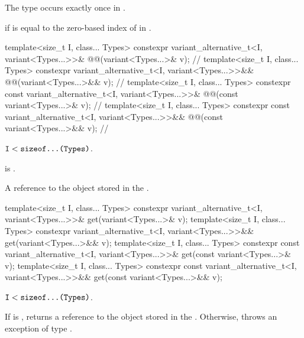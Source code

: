 \begin{itemdescr}
\pnum
\mandates
The type  occurs exactly once in .

\pnum
\returns
{} if  is equal to the zero-based index of  in .
\end{itemdescr}

\begin{itemdecl}
template<size_t I, class... Types>
  constexpr variant_alternative_t<I, variant<Types...>>&
    @@(variant<Types...>& v);                                  // \expos
template<size_t I, class... Types>
  constexpr variant_alternative_t<I, variant<Types...>>&&
    @@(variant<Types...>&& v);                                 // \expos
template<size_t I, class... Types>
  constexpr const variant_alternative_t<I, variant<Types...>>&
    @@(const variant<Types...>& v);                            // \expos
template<size_t I, class... Types>
  constexpr const variant_alternative_t<I, variant<Types...>>&&
    @@(const variant<Types...>&& v);                           // \expos
\end{itemdecl}

\begin{itemdescr}
\pnum
\mandates
$\texttt{\protect I} < \texttt{\protect sizeof...(Types)}$.

\pnum
\expects
{} is .

\pnum
\returns
A reference to the object stored in the .
\end{itemdescr}

%
\begin{itemdecl}
template<size_t I, class... Types>
  constexpr variant_alternative_t<I, variant<Types...>>& get(variant<Types...>& v);
template<size_t I, class... Types>
  constexpr variant_alternative_t<I, variant<Types...>>&& get(variant<Types...>&& v);
template<size_t I, class... Types>
  constexpr const variant_alternative_t<I, variant<Types...>>& get(const variant<Types...>& v);
template<size_t I, class... Types>
  constexpr const variant_alternative_t<I, variant<Types...>>&& get(const variant<Types...>&& v);
\end{itemdecl}

\begin{itemdescr}
\pnum
\mandates
$\texttt{\protect I} < \texttt{\protect sizeof...(Types)}$.

\pnum
\effects
If  is , returns a reference to the object stored in
the . Otherwise, throws an exception of type .
\end{itemdescr}

